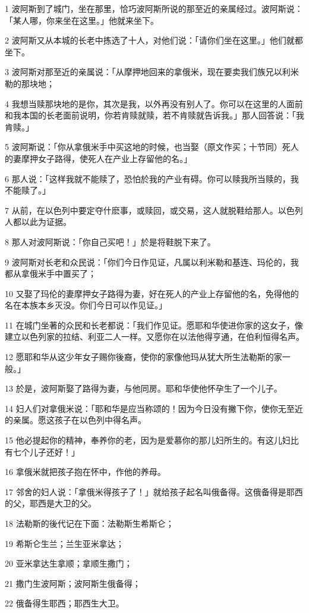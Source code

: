 \par 1 波阿斯到了城门，坐在那里，恰巧波阿斯所说的那至近的亲属经过。波阿斯说：「某人哪，你来坐在这里。」他就来坐下。
\par 2 波阿斯又从本城的长老中拣选了十人，对他们说：「请你们坐在这里。」他们就都坐下。
\par 3 波阿斯对那至近的亲属说：「从摩押地回来的拿俄米，现在要卖我们族兄以利米勒的那块地；
\par 4 我想当赎那块地的是你，其次是我，以外再没有别人了。你可以在这里的人面前和我本国的长老面前说明，你若肯赎就赎，若不肯赎就告诉我。」那人回答说：「我肯赎。」
\par 5 波阿斯说：「你从拿俄米手中买这地的时候，也当娶（原文作买；十节同）死人的妻摩押女子路得，使死人在产业上存留他的名。」
\par 6 那人说：「这样我就不能赎了，恐怕於我的产业有碍。你可以赎我所当赎的，我不能赎了。」
\par 7 从前，在以色列中要定夺什麽事，或赎回，或交易，这人就脱鞋给那人。以色列人都以此为证据。
\par 8 那人对波阿斯说：「你自己买吧！」於是将鞋脱下来了。
\par 9 波阿斯对长老和众民说：「你们今日作见证，凡属以利米勒和基连、玛伦的，我都从拿俄米手中置买了；
\par 10 又娶了玛伦的妻摩押女子路得为妻，好在死人的产业上存留他的名，免得他的名在本族本乡灭没。你们今日可以作见证。」
\par 11 在城门坐著的众民和长老都说：「我们作见证。愿耶和华使进你家的这女子，像建立以色列家的拉结、利亚二人一样。又愿你在以法他得亨通，在伯利恒得名声。
\par 12 愿耶和华从这少年女子赐你後裔，使你的家像他玛从犹大所生法勒斯的家一般。」
\par 13 於是，波阿斯娶了路得为妻，与他同房。耶和华使他怀孕生了一个儿子。
\par 14 妇人们对拿俄米说：「耶和华是应当称颂的！因为今日没有撇下你，使你无至近的亲属。愿这孩子在以色列中得名声。
\par 15 他必提起你的精神，奉养你的老，因为是爱慕你的那儿妇所生的。有这儿妇比有七个儿子还好！」
\par 16 拿俄米就把孩子抱在怀中，作他的养母。
\par 17 邻舍的妇人说：「拿俄米得孩子了！」就给孩子起名叫俄备得。这俄备得是耶西的父，耶西是大卫的父。
\par 18 法勒斯的後代记在下面：法勒斯生希斯仑；
\par 19 希斯仑生兰；兰生亚米拿达；
\par 20 亚米拿达生拿顺；拿顺生撒门；
\par 21 撒门生波阿斯；波阿斯生俄备得；
\par 22 俄备得生耶西；耶西生大卫。


